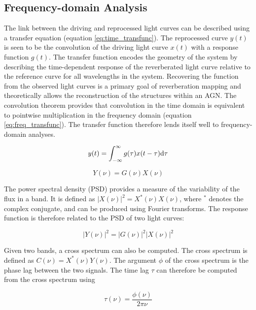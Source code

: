 \documentclass[11pt,letterpaper]{article}
\begin{document}
    \subsection{Frequency-domain Analysis}
    \label{sec:freq_analysis}

    The link between the driving and reprocessed light curves can be described using a transfer equation (equation \ref{eq:time_transfunc}). The reprocessed curve $y(t)$ is seen to be the convolution of the driving light curve $x(t)$ with a response function $g(t)$. The transfer function encodes the geometry of the system by describing the time-dependent response of the reverberated light curve relative to the reference curve for all wavelengths in the system. Recovering the function from the observed light curves is a primary goal of reverberation mapping and theoretically allows the reconstruction of the structures within an AGN. The convolution theorem provides that convolution in the time domain is equivalent to pointwise multiplication in the frequency domain (equation \ref{eq:freq_transfunc}). The transfer function therefore lends itself well to frequency-domain analyses.

    \begin{equation}
        \label{eq:time_transfunc}
        y(t) = \int_{-\infty}^{\infty} g(\tau) x(t-\tau)  {\rm d}\tau
    \end{equation}

    \begin{equation}
        \label{eq:freq_transfunc}
        Y(\nu) = G(\nu) X(\nu)
    \end{equation}

    The power spectral density (PSD) provides a measure of the variability of the flux in a band. It is defined as $|X(\nu)|^2 = X^*(\nu)X(\nu)$, where $^*$ denotes the complex conjugate, and can be produced using Fourier transforms. The response function is therefore related to the PSD of two light curves:

    \begin{equation}
        |Y(\nu)|^2 = |G(\nu)|^2 |X(\nu)|^2
    \end{equation}

    Given two bands, a cross spectrum can also be computed. The cross spectrum is defined as $C(\nu) = X^*(\nu) Y(\nu)$. The argument $\phi$ of the cross spectrum is the phase lag between the two signals. The time lag $\tau$ can therefore be computed from the cross spectrum using

    \begin{equation}
        \tau(\nu) = \frac{\phi(\nu)}{2\pi\nu}
    \end{equation}
\end{document}
